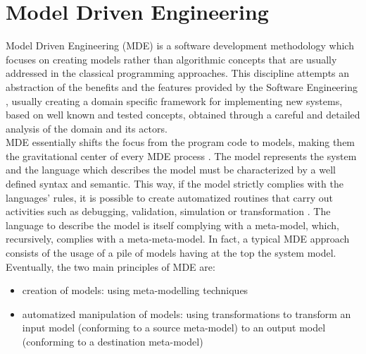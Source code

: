 \section{Model Driven Engineering}
\label{ModelDrivenEngineering}
Model Driven Engineering (MDE) is a software development methodology which focuses on creating models rather than algorithmic concepts that are usually addressed in the classical programming approaches.
This discipline attempts an abstraction of the benefits and the features provided by the Software Engineering \cite{Marrone}, usually creating a domain specific framework for implementing new systems, based on well known and tested concepts, obtained through a careful and detailed analysis of the domain and its actors.\\
%
MDE essentially shifts the focus from the program code to models, making them the gravitational center of every MDE process \cite{Lukman08}. The model represents the system and the language which describes the model must be characterized by a well defined syntax and semantic. This way, if the model strictly complies with the languages' rules, it is possible to create automatized routines that carry out activities such as debugging, validation, simulation or transformation \cite{Papa11}. 
The language to describe the model is itself complying with a meta-model, which, recursively, complies with a meta-meta-model. In fact, a typical MDE approach consists of the usage of a pile of models having at the top the system model. \\
%
Eventually, the two main principles of MDE are:
\begin{itemize}
 \item creation of models: using meta-modelling techniques
 \item automatized manipulation of models: using transformations to transform an input model (conforming to a source meta-model) to an output model (conforming to a destination meta-model)
\end{itemize}

